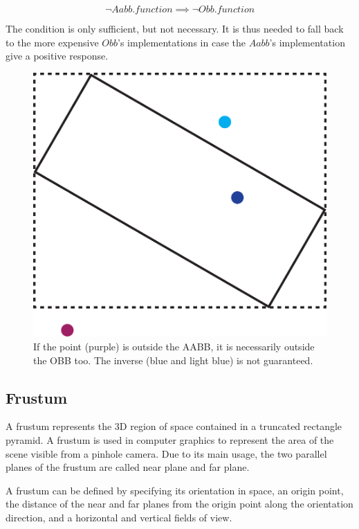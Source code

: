 \documentclass{PoliMi_MasterThesis}
\begin{document}
$$\neg Aabb.function \implies \neg Obb.function$$

The condition is only sufficient, but not necessary. It is thus needed to fall back to the more expensive $Obb$'s implementations in case the $Aabb$'s implementation give a positive response.
\begin{figure}[H]
    \centering
    \includegraphics[width=\textwidth*\real{0.35}]{Images/obb_aabb_rejection_test.png}
    \caption{If the point (purple) is outside the AABB, it is necessarily outside the OBB too. The inverse (blue and light blue) is not guaranteed.}
    \label{fig:aabb_for_obb_contains}
\end{figure}


\subsection{Frustum} \label{ssec:frustum}
A frustum represents the 3D region of space contained in a truncated rectangle pyramid. A frustum is used in computer graphics to represent the area of the scene visible from a pinhole camera. Due to its main usage, the two parallel planes of the frustum are called near plane and far plane.

A frustum can be defined by specifying its orientation in space, an origin point, the distance of the near and far planes from the origin point along the orientation direction, and a horizontal and vertical fields of view.
\end{document}
